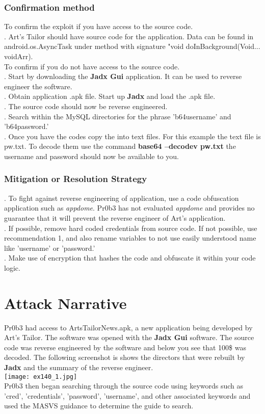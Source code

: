 \documentclass[notitlepage]{article}
\begin{document}
	\subsubsection{Confirmation method}
	To confirm the exploit if you have access to the source code. \\
	. Art's Tailor should have source code for the application. Data can be found in android.os.AsyncTask under method with signature "void doInBackground(Void... voidArr).\\
	To confirm if you do not have access to the source code.\\
	. Start by downloading the \textbf{Jadx Gui} application. It can be used to reverse engineer the software. \\
	. Obtain application .apk file.  Start up \textbf{Jadx} and load the .apk file. \\
	. The source code should now be reverse engineered.  \\
	. Search within the MySQL directories for the phrase 'b64username' and 'b64password.' \\
	. Once you have the codes copy the into text files. For this example the text file is pw.txt. To decode them use the command \textbf{base64 --decodev pw.txt}
	\indent the username and password should now be available to you. 
		
	\subsubsection{Mitigation or Resolution Strategy}
	. To fight against reverse engineering of application, use a code obfuscation application such as \textit{appdome}.  Pr0b3 has not evaluated \textit{appdome} and provides no guarantee that it will prevent the reverse engineer of Art's application. \\
	. If possible, remove hard coded credentials from source code.  If not possible, use recommendation 1, and also rename variables to not use easily understood name like 'username' or 'password.' \\
	. Make use of encryption that hashes the code and obfuscate it within your code logic.  
	
	\section{Attack Narrative}
	
	\indent Pr0b3 had access to ArtsTailorNews.apk, a new application being developed by Art's Tailor. The software was opened with the \textbf{Jadx Gui} software. The source code was reverse engineered by the software and below you see that 100\$ was decoded. The following screenshot is shows the directors that were rebuilt by \textbf{Jadx} and the summary of the reverse engineer.  \\
		\texttt{[image: ex140\_1.jpg]} \\
	\indent Pr0b3 then began searching through the source code using keywords such as 'cred', 'credentials', 'password', 'username', and other associated keywords and used the MASVS guidance to determine the guide to search.  \\
\end{document}
